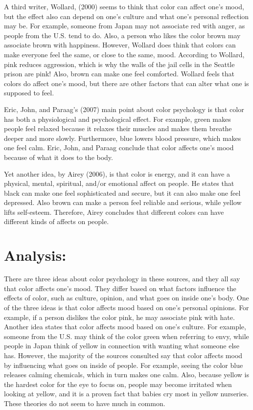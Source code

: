 \documentclass[12pt, letterpaper]{article}
\begin{document}
 	A third writer, Wollard, (2000) seems to think that color can affect one’s mood, but the effect also can depend on one’s culture and what one’s personal reflection may be. For example, someone from Japan may not associate red with anger, as people from the U.S. tend to do. Also, a person who likes the color brown may associate brown with happiness. However, Wollard does think that colors can make everyone feel the same, or close to the same, mood. According to Wollard, pink reduces aggression, which is why the walls of the jail cells in the Seattle prison are pink! Also, brown can make one feel comforted. Wollard feels that colors do affect one’s mood, but there are other factors that can alter what one is supposed to feel.\par
	 Eric, John, and Paraag’s (2007) main point about color psychology is that color has both a physiological and psychological effect. For example, green makes people feel relaxed because it relaxes their muscles and makes them breathe deeper and more slowly. Furthermore, blue lowers blood pressure, which makes one feel calm. Eric, John, and Paraag conclude that color affects one’s mood because of what it does to the body.\par
	Yet another idea, by Airey (2006), is that color is energy, and it can have a physical, mental, spiritual, and/or emotional affect on people. He states that black can make one feel sophisticated and secure, but it can also make one feel depressed. Also brown can make a person feel reliable and serious, while yellow lifts self-esteem. Therefore, Airey concludes that different colors can have different kinds of affects on people.\par


\section{Analysis:}
There are three ideas about color psychology in these sources, and they all say that color affects one’s mood. They differ based on what factors influence the effects of color, such as culture, opinion, and what goes on inside one’s body.  One of the three ideas is that color affects mood based on one’s personal opinions. For example, if a person dislikes the color pink, he may associate pink with hate. Another idea states that color affects mood based on one’s culture. For example, someone from the U.S. may think of the color green when referring to envy, while people in Japan think of yellow in connection with wanting what someone else has. However, the majority of the sources consulted say that color affects mood by influencing what goes on inside of people. For example, seeing the color blue releases calming chemicals, which in turn makes one calm. Also, because yellow is the hardest color for the eye to focus on, people may become irritated when looking at yellow, and it is a proven fact that babies cry most in yellow nurseries. \\
These theories do not seem to have much in common.
\end{document}
